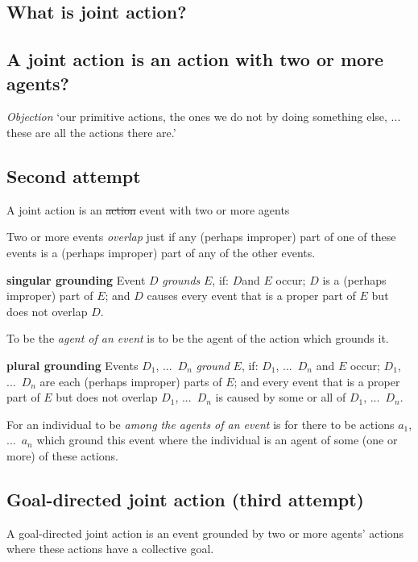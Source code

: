 \documentclass[11pt]{extarticle}
\begin{document}
\begin{multicols}{3}
\section{What is joint action?}



\subsection{A joint action is an action with two or more agents?\citep{ludwig_collective_2007}}

\emph{Objection} 
`our primitive actions, the ones we do not by doing something else, ... these are all the actions there are.'\citep%
{Davidson:1971fz}


\subsection{Second attempt}
A joint action is an \sout{action} event with two or more agents\citep{ludwig_collective_2007}

Two or more events \emph{overlap} just if any (perhaps improper) part of one of these events is a (perhaps improper) part of any of the other events.

\textbf{singular grounding} 
Event $D$ \emph{grounds} $E$, if: $D$and $E$ occur; 
$D$ is a (perhaps improper) part of $E$; and 
$D$ causes every event that is a proper part of $E$ but does not overlap $D$.

To be the \emph{agent of an event} is to be the agent of the action which grounds it.\citep%
{pietroski_actions_1998}


\textbf{plural grounding} 
Events $D_1$, ...\ $D_n$ \emph{ground} $E$, if: $D_1$, ...\ $D_n$ and $E$ occur; 
$D_1$, ...\ $D_n$ are each (perhaps improper) parts of $E$; and 
every event that is a proper part of $E$ but does not overlap  $D_1$, ...\ $D_n$ is caused by some or all of $D_1$, ...\ $D_n$.

For an individual to be \emph{among the agents of an event} is for there to be actions $a_1$, ...\ $a_n$ which ground this event where the individual is an agent of some (one or more) of these actions.



\subsection{Goal-directed joint action (third attempt)}

A goal-directed joint action is an event grounded by two or more agents’ actions where these actions have a collective goal.


\end{multicols}
\end{document}
